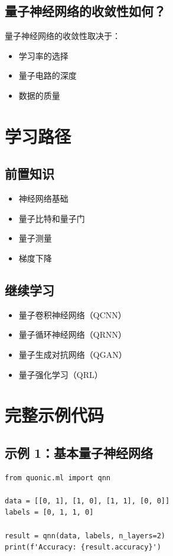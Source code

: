 \documentclass[12pt,a4paper]{article}
\begin{document}
\subsection{量子神经网络的收敛性如何？}

量子神经网络的收敛性取决于：
\begin{itemize}
  \item 学习率的选择
  \item 量子电路的深度
  \item 数据的质量
\end{itemize}

\section{学习路径}

\subsection{前置知识}
\begin{itemize}
  \item 神经网络基础
  \item 量子比特和量子门
  \item 量子测量
  \item 梯度下降
\end{itemize}

\subsection{继续学习}
\begin{itemize}
  \item 量子卷积神经网络（QCNN）
  \item 量子循环神经网络（QRNN）
  \item 量子生成对抗网络（QGAN）
  \item 量子强化学习（QRL）
\end{itemize}

\section{完整示例代码}

\subsection{示例 1：基本量子神经网络}

\begin{verbatim}
from quonic.ml import qnn

data = [[0, 1], [1, 0], [1, 1], [0, 0]]
labels = [0, 1, 1, 0]

result = qnn(data, labels, n_layers=2)
print(f'Accuracy: {result.accuracy}')
\end{verbatim}
\end{document}
